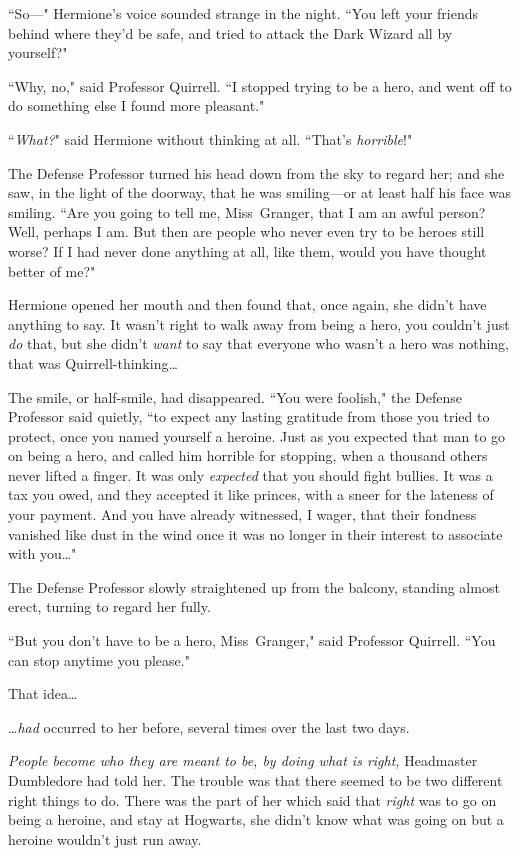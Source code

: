 ``So—" Hermione's voice sounded strange in the night. ``You left your friends behind where they'd be safe, and tried to attack the Dark Wizard all by yourself?"

``Why, no," said Professor Quirrell. ``I stopped trying to be a hero, and went off to do something else I found more pleasant."

``\emph{What?}" said Hermione without thinking at all. ``That's \emph{horrible}!"

The Defense Professor turned his head down from the sky to regard her; and she saw, in the light of the doorway, that he was smiling—or at least half his face was smiling. ``Are you going to tell me, Miss~Granger, that I am an awful person? Well, perhaps I am. But then are people who never even try to be heroes still worse? If I had never done anything at all, like them, would you have thought better of me?"

Hermione opened her mouth and then found that, once again, she didn't have anything to say. It wasn't right to walk away from being a hero, you couldn't just \emph{do} that, but she didn't \emph{want} to say that everyone who wasn't a hero was nothing, that was Quirrell-thinking{\ldots}

The smile, or half-smile, had disappeared. ``You were foolish," the Defense Professor said quietly, ``to expect any lasting gratitude from those you tried to protect, once you named yourself a heroine. Just as you expected that man to go on being a hero, and called him horrible for stopping, when a thousand others never lifted a finger. It was only \emph{expected} that you should fight bullies. It was a tax you owed, and they accepted it like princes, with a sneer for the lateness of your payment. And you have already witnessed, I wager, that their fondness vanished like dust in the wind once it was no longer in their interest to associate with you{\ldots}"

The Defense Professor slowly straightened up from the balcony, standing almost erect, turning to regard her fully.

``But you don't have to be a hero, Miss~Granger," said Professor Quirrell. ``You can stop anytime you please."

That idea{\ldots}

{\ldots}\emph{had} occurred to her before, several times over the last two days.

\emph{People become who they are meant to be, by doing what is right,} Headmaster Dumbledore had told her. The trouble was that there seemed to be two different right things to do. There was the part of her which said that \emph{right} was to go on being a heroine, and stay at Hogwarts, she didn't know what was going on but a heroine wouldn't just run away.

